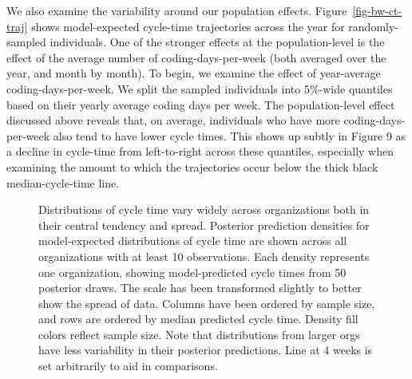 \documentclass[
]{article}
\begin{document}
We also examine the variability around our population effects.
Figure~\ref{fig-bw-ct-traj} shows model-expected cycle-time trajectories
across the year for randomly-sampled individuals. One of the stronger
effects at the population-level is the effect of the average number of
coding-days-per-week (both averaged over the year, and month by month).
To begin, we examine the effect of year-average coding-days-per-week. We
split the sampled individuals into 5\%-wide quantiles based on their
yearly average coding days per week. The population-level effect
discussed above reveals that, on average, individuals who have more
coding-days-per-week also tend to have lower cycle times. This shows up
subtly in Figure 9 as a decline in cycle-time from left-to-right across
these quantiles, especially when examining the amount to which the
trajectories occur below the thick black median-cycle-time line.

\begin{figure}


\caption[Distributions of cycle time vary widely across organizations
both in their central tendency and
spread]{\label{fig-pp-check-org}Distributions of cycle time vary widely
across organizations both in their central tendency and spread.
Posterior prediction densities for model-expected distributions of cycle
time are shown across all organizations with at least 10 observations.
Each density represents one organization, showing model-predicted cycle
times from 50 posterior draws. The scale has been transformed slightly
to better show the spread of data. Columns have been ordered by sample
size, and rows are ordered by median predicted cycle time. Density fill
colors reflect sample size. Note that distributions from larger orgs
have less variability in their posterior predictions. Line at 4 weeks is
set arbitrarily to aid in comparisons.}

\end{figure}%
\end{document}
